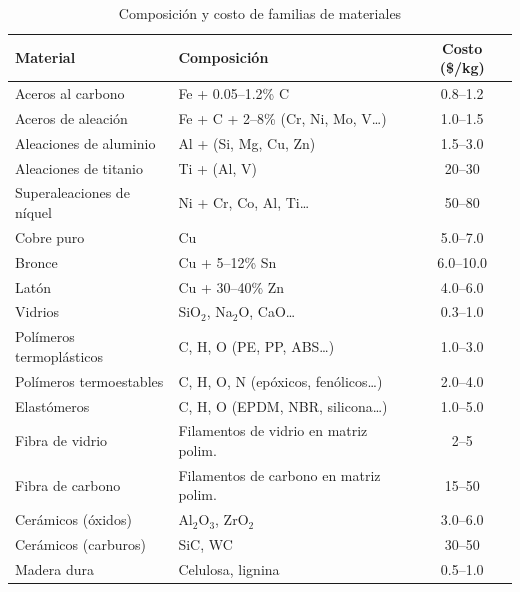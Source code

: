 \begin{table}[htbp]
  \centering
  \small
  \caption{Composición y costo de familias de materiales}
  \label{tab:prop_mat_comp_costo}
  \begin{tabular}{@{} l l c @{}}
    \toprule
    Material                  & Composición                          & Costo (\$/kg) \\
    \midrule
    Aceros al carbono         & Fe + 0.05–1.2\% C                    & 0.8–1.2       \\
    Aceros de aleación        & Fe + C + 2–8\% (Cr, Ni, Mo, V…)      & 1.0–1.5       \\
    Aleaciones de aluminio    & Al + (Si, Mg, Cu, Zn)                & 1.5–3.0       \\
    Aleaciones de titanio     & Ti + (Al, V)                         & 20–30         \\
    Superaleaciones de níquel & Ni + Cr, Co, Al, Ti…                 & 50–80         \\
    Cobre puro                & Cu                                   & 5.0–7.0       \\
    Bronce                    & Cu + 5–12\% Sn                       & 6.0–10.0      \\
    Latón                     & Cu + 30–40\% Zn                      & 4.0–6.0       \\
    Vidrios                   & SiO$_2$, Na$_2$O, CaO…               & 0.3–1.0       \\
    Polímeros termoplásticos  & C, H, O (PE, PP, ABS…)               & 1.0–3.0       \\
    Polímeros termoestables   & C, H, O, N (epóxicos, fenólicos…)    & 2.0–4.0       \\
    Elastómeros               & C, H, O (EPDM, NBR, silicona…)       & 1.0–5.0       \\
    Fibra de vidrio           & Filamentos de vidrio en matriz polim. & 2–5           \\
    Fibra de carbono          & Filamentos de carbono en matriz polim. & 15–50         \\
    Cerámicos (óxidos)        & Al$_2$O$_3$, ZrO$_2$                 & 3.0–6.0       \\
    Cerámicos (carburos)      & SiC, WC                              & 30–50         \\
    Madera dura               & Celulosa, lignina                    & 0.5–1.0       \\
    \bottomrule
  \end{tabular}
\end{table}

